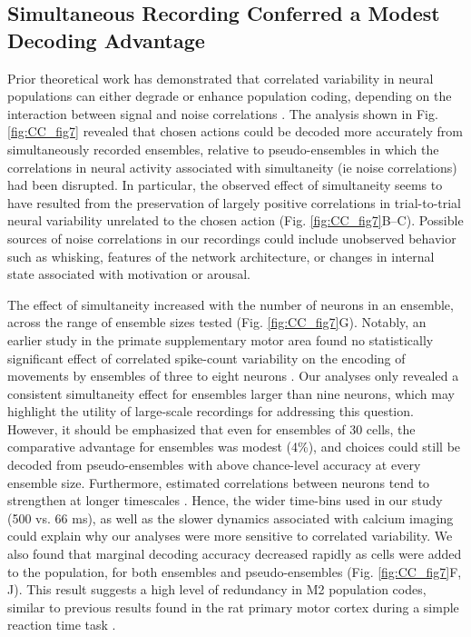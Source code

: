 \subsection*{Simultaneous Recording Conferred a Modest Decoding Advantage}
Prior theoretical work has demonstrated that correlated variability in neural populations can either degrade or enhance population coding, depending on the interaction between signal and noise correlations \citep{averbeck2003neural, averbeck2006neural}. The analysis shown in Fig. \ref{fig:CC_fig7} revealed that chosen actions could be decoded more accurately from simultaneously recorded ensembles, relative to pseudo-ensembles in which the correlations in neural activity associated with simultaneity (ie noise correlations) had been disrupted. In particular, the observed effect of simultaneity seems to have resulted from the preservation of largely positive correlations in trial-to-trial neural variability unrelated to the chosen action (Fig. \ref{fig:CC_fig7}B--C). Possible sources of noise correlations in our recordings could include unobserved behavior such as whisking, features of the network architecture, or changes in internal state associated with motivation or arousal.

The effect of simultaneity increased with the number of neurons in an ensemble, across the range of ensemble sizes tested (Fig. \ref{fig:CC_fig7}G). Notably, an earlier study in the primate supplementary motor area found no statistically significant effect of correlated spike-count variability on the encoding of movements by ensembles of three to eight neurons \citep{averbeck2006effects}. Our analyses only revealed a consistent simultaneity effect for ensembles larger than nine neurons, which may highlight the utility of large-scale recordings for addressing this question. However, it should be emphasized that even for ensembles of 30 cells, the comparative advantage for ensembles was modest (4\%), and choices could still be decoded from pseudo-ensembles with above chance-level accuracy at every ensemble size. Furthermore, estimated correlations between neurons tend to strengthen at longer timescales \citep{averbeck2003neural}. Hence, the wider time-bins used in our study (500 vs. 66 ms), as well as the slower dynamics associated with calcium imaging could explain why our analyses were more sensitive to correlated variability. We also found that marginal decoding accuracy decreased rapidly as cells were added to the population, for both ensembles and pseudo-ensembles (Fig. \ref{fig:CC_fig7}F, J). This result suggests a high level of redundancy in M2 population codes, similar to previous results found in the rat primary motor cortex during a simple reaction time task \citep{narayanan2005redundancy}.

